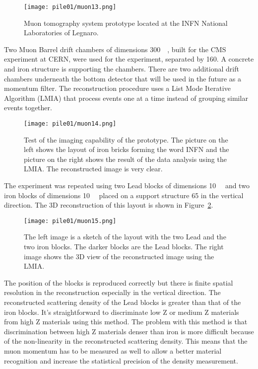 \documentclass[twoside,titlepage,11pt,twocolumn,a4paper]{article}
\begin{document}
\begin{figure}
  \texttt{[image: pile01/muon13.png]}
  \caption{Muon tomography system prototype located at the INFN
    National Laboratories of Legnaro. \citep{pesente2009}}
  \label{fig:muon13}
\end{figure}

Two Muon Barrel drift chambers of dimensions
\unit{300}{\cubic{\centi\metre}}, built for the CMS
experiment at CERN, were used for the experiment, separated by
\unit{160}{\centi\metre}. A concrete and iron structure is supporting
the chambers. There are two additional drift chambers underneath the
bottom detector that will be used in the future as a momentum
filter. The reconstruction procedure uses a List Mode Iterative
Algorithm (LMIA) that process events one at a time instead of grouping
similar events together. \citep{pesente2009}

\begin{figure}
  \texttt{[image: pile01/muon14.png]}
  \caption{Test of the imaging capability of the prototype. The
    picture on the left shows the layout of iron bricks forming the
    word INFN and the picture on the right shows the result of the
    data analysis using the LMIA. The reconstructed image is very
    clear. \citep{pesente2009}}
\end{figure}

The experiment was repeated using two Lead blocks of dimensions
\unit{10}{\cubic{\centi\metre}} and two iron blocks of
dimensions \unit{10}{\cubic{\centi\metre}} placed on a
support structure \unit{65}{\centi\metre} in the vertical
direction. The 3D reconstruction of this layout is shown in
Figure~\ref{fig:muon15}.

\begin{figure}
  \texttt{[image: pile01/muon15.png]}
  \caption{The left image is a sketch of the layout with the two Lead
    and the two iron blocks. The darker blocks are the Lead
    blocks. The right image shows the 3D view of the reconstructed
    image using the LMIA. \citep{pesente2009}}
  \label{fig:muon15}
\end{figure}

The position of the blocks is reproduced correctly but there is finite
spatial resolution in the reconstruction especially in the vertical
direction. The reconstructed scattering density of the Lead blocks is
greater than that of the iron blocks. It’s straightforward to
discriminate low Z or medium Z materials from high Z materials using
this method. The problem with this method is that discrimination
between high Z materials denser than iron is more difficult because of
the non-linearity in the reconstructed scattering density. This means
that the muon momentum has to be measured as well to allow a better
material recognition and increase the statistical precision of the
density measurement. \citep{pesente2009}
\end{document}
